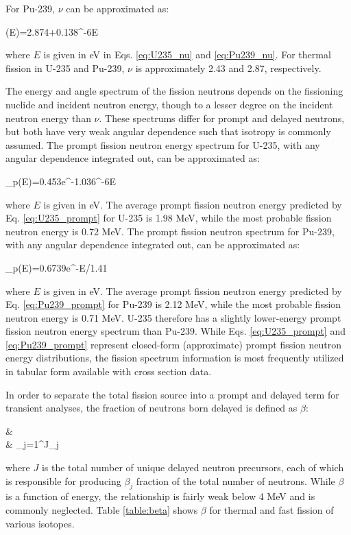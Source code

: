 For Pu-239, \(\nu\) can be approximated as:

\beq
\label{eq:Pu239_nu}
\nu(E)=2.874+0.138^{-6}E
\eeq

where \(E\) is given in eV in Eqs. \eqref{eq:U235_nu} and \eqref{eq:Pu239_nu}. For thermal fission in U-235 and Pu-239, \(\nu\) is approximately 2.43 and 2.87, respectively. 

The energy and angle spectrum of the fission neutrons depends on the fissioning nuclide and incident neutron energy, though to a lesser degree on the incident neutron energy than \(\nu\). These spectrums differ for prompt and delayed neutrons, but both have very weak angular dependence such that isotropy is commonly assumed. The prompt fission neutron energy spectrum for U-235, with any angular dependence integrated out, can be approximated as:

\beq
\label{eq:U235_prompt}
\chi_p(E)=0.453e^{-1.036^{-6}E}
\eeq

where \(E\) is given in eV. The average prompt fission neutron energy predicted by Eq. \eqref{eq:U235_prompt} for U-235 is 1.98 MeV, while the most probable fission neutron energy is 0.72 MeV. The prompt fission neutron spectrum for Pu-239, with any angular dependence integrated out, can be approximated as:

\beq
\label{eq:Pu239_prompt}
\chi_p(E)=0.6739e^{-E/1.41}
\eeq

where \(E\) is given in eV. The average prompt fission neutron energy predicted by Eq. \eqref{eq:Pu239_prompt} for Pu-239 is 2.12 MeV, while the most probable fission neutron energy is 0.71 MeV. U-235 therefore has a slightly lower-energy prompt fission neutron energy spectrum than Pu-239. While Eqs. \eqref{eq:U235_prompt} and \eqref{eq:Pu239_prompt} represent closed-form (approximate) prompt fission neutron energy distributions, the fission spectrum information is most frequently utilized in tabular form available with cross section data.

In order to separate the total fission source into a prompt and delayed term for transient analyses, the fraction of neutrons born delayed is defined as \(\beta\):

\beqa
\label{eq:BetaDef}
\beta\equiv&\ \\
\equiv& \sum_{j=1}^J\beta_j
\eeqa

where \(J\) is the total number of unique delayed neutron precursors, each of which is responsible for producing \(\beta_j\) fraction of the total number of neutrons. While \(\beta\) is a function of energy, the relationship is fairly weak below 4 MeV and is commonly neglected. Table \ref{table:beta} shows \(\beta\) for thermal and fast fission of various isotopes.

